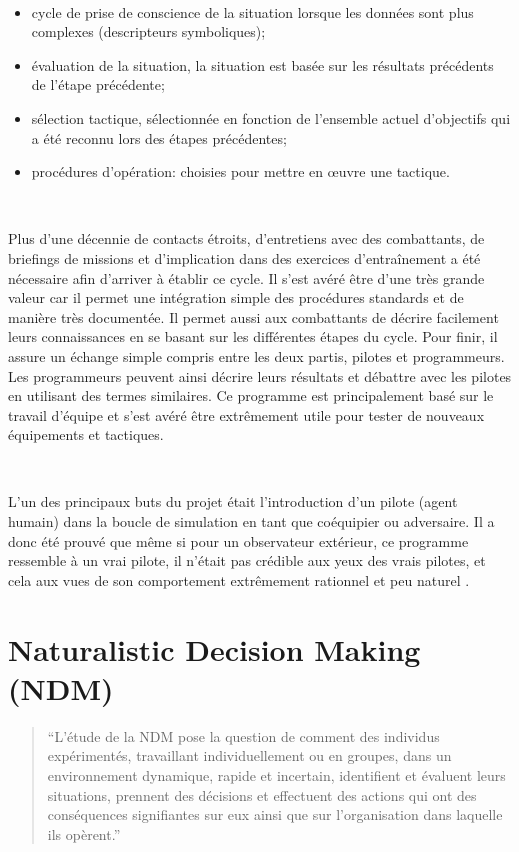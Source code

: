 ~\par
\begin{itemize}
\item cycle de prise de conscience de la situation lorsque les données sont plus complexes (descripteurs symboliques);
\item  évaluation de la situation, la situation est basée sur les résultats précédents de l'étape précédente;
\item sélection tactique, sélectionnée en fonction de l'ensemble actuel d'objectifs qui a été reconnu lors des étapes précédentes;
\item procédures d'opération: choisies pour mettre en œuvre une tactique.
\end{itemize}

~\par
Plus d'une décennie de contacts étroits, d'entretiens avec des combattants, de briefings de missions et d'implication dans des exercices d'entraînement a été nécessaire afin d’arriver à établir ce cycle. Il s’est avéré être d’une très grande valeur car il permet une intégration simple des procédures standards et de manière très documentée. Il permet aussi aux combattants de décrire facilement leurs connaissances en se basant sur les différentes étapes du cycle. Pour finir, il assure un échange simple compris entre les deux partis, pilotes et programmeurs. Les programmeurs peuvent ainsi décrire leurs résultats et débattre avec les pilotes en utilisant des termes similaires. Ce programme est principalement  basé sur le travail d’équipe et s’est avéré être extrêmement utile pour tester de nouveaux équipements et tactiques.

~\par
L’un des principaux buts du projet était l’introduction d’un pilote (agent humain) dans la boucle de simulation en tant que coéquipier ou adversaire. Il a donc été prouvé que même si pour un observateur extérieur, ce programme ressemble à un vrai pilote, il n’était pas crédible aux yeux des vrais pilotes, et cela aux vues de son comportement extrêmement rationnel et peu naturel \parencite{norling2000enhancing}.


\section{Naturalistic Decision Making (NDM)} \label{ndm}

\begin{quotation}
“L’étude de la NDM  pose la question de comment des individus expérimentés, travaillant individuellement ou en groupes, dans un environnement dynamique, rapide et incertain, identifient et évaluent leurs situations, prennent des décisions et effectuent des actions qui ont des conséquences signifiantes sur eux ainsi que sur l'organisation dans laquelle ils opèrent.” \parencite{zsambok2014naturalistic} \end{quotation} 



